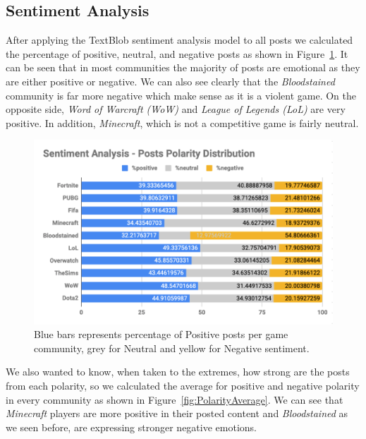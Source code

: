 \subsection{Sentiment Analysis}
After applying the TextBlob sentiment analysis model to all posts we calculated the percentage of positive, neutral, and negative posts as shown in Figure~\ref{fig:Polarity}. It can be seen that in most communities the majority of posts are emotional as they are either positive or negative. We can also see clearly that the \emph{Bloodstained} community is far more negative which make sense as it is a violent game. On the opposite side, \emph{Word of Warcraft (WoW)} and \emph{League of Legends (LoL)} are very positive. In addition, \emph{Minecraft}, which is not a competitive game is fairly neutral.

\begin{figure}[h]
    \begin{center}
        \includegraphics[scale=0.43]{Images/sentiment-analysis-polarity.png}
    \end{center}
    \caption{Blue bars represents percentage of Positive posts per game community, grey for Neutral and yellow for Negative sentiment.}
    \label{fig:Polarity}
\end{figure}

We also wanted to know, when taken to the extremes, how strong are the posts from each polarity, so we calculated the average for positive and negative polarity in every community as shown in Figure~\ref{fig:PolarityAverage}. We can see that \emph{Minecraft} players are more positive in their posted content and \emph{Bloodstained} as we seen before, are expressing stronger negative emotions.

